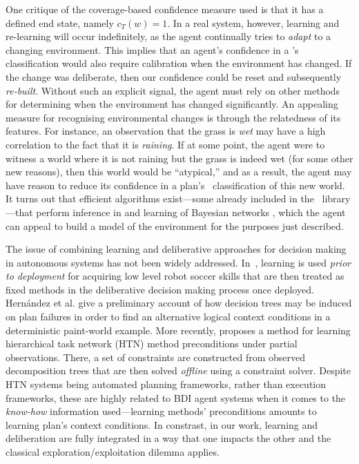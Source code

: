 One critique of the coverage-based confidence measure used is that it has a
defined end state, namely $c_T(w)=1$. In a real system, however, learning and
re-learning will occur indefinitely, as the agent continually tries to
\emph{adapt} to a changing environment. This implies that an agent's confidence
in a \dt's classification would also require calibration when the environment has
changed. If the change was deliberate, then our confidence could be reset and
subsequently \textit{re-built}. Without such an explicit signal, the agent must
rely on other methods for determining when the environment has changed
significantly.
An appealing measure for recognising environmental changes is through the
relatedness of its features. For instance, an observation that the grass is
\textit{wet} may have a high correlation to the fact that it is \textit{raining}.
If at some point, the agent were to witness a world where it is not raining but
the grass is indeed wet (for some other new reasons), then this world would be
``atypical,''  and as a result, the agent may have reason to reduce its
confidence in a plan's \dt\ classification of this new world.
It turns out that efficient algorithms exist---some already included in the
\weka\ library---that perform inference in and learning of Bayesian networks
\cite{Mitchell97:ML}, which the agent can appeal to build a model of the
environment for the purposes just described.



The issue of combining learning and deliberative approaches for decision making
in autonomous systems has not been widely addressed.
In~\cite{Riedmiller01}, learning is used \emph{prior to deployment} for acquiring
low level robot soccer skills that are then treated as fixed methods in the
deliberative decision making process once deployed.
Hern\'andez et al. \cite{Hernandez04:Learning} give a preliminary account of how
decision trees may be induced on plan failures in order to find an alternative
logical context conditions in a deterministic paint-world example.
More recently, \cite{Zhuo09:Learning} proposes a method for learning hierarchical
task network (HTN) method preconditions under partial observations. There, a set
of  constraints are constructed from observed decomposition trees that are then
solved \emph{offline} using a constraint solver. Despite HTN systems being
automated planning frameworks, rather than execution frameworks, these are highly
related to BDI agent systems when it comes to the \emph{know-how} information
used---learning methods' preconditions amounts to learning plan's context
conditions.
In constrast, in our work, learning and deliberation are fully integrated in a
way that one impacts the other and the classical exploration/exploitation dilemma
applies.




